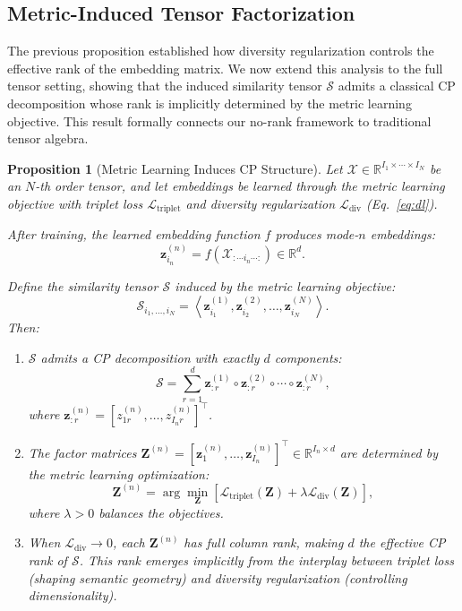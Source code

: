 \documentclass[a4paper,12pt,reqno]{amsart}
\newtheorem{proposition}[theorem]{\textbf{Proposition}}
\theoremstyle{definition}
\theoremstyle{remark}
\begin{document}
	\subsection{Metric-Induced Tensor Factorization}The previous proposition established how diversity regularization controls the effective rank of the embedding matrix. 
		We now extend this analysis to the full tensor setting, showing that the induced similarity tensor $\mathcal{S}$ 
		admits a classical CP decomposition whose rank is implicitly determined by the metric learning objective. 
		This result formally connects our no-rank framework to traditional tensor algebra.
		\begin{proposition}[Metric Learning Induces CP Structure]
		\label{prop:metric_factorization}
		Let $\mathcal{X} \in \mathbb{R}^{I_1 \times \cdots \times I_N}$ be an $N$-th order tensor, and let embeddings be learned through the metric learning objective with triplet loss $\mathcal{L}_{\text{triplet}}$ and diversity regularization $\mathcal{L}_{\text{div}}$ (Eq.~\eqref{eq:dl}). 
		
		After training, the learned embedding function $f$ produces mode-$n$ embeddings:
		\[
		\mathbf{z}_{i_n}^{(n)} = f(\mathcal{X}_{: \cdots i_n \cdots :}) \in \mathbb{R}^d.
		\]
		
		Define the similarity tensor $\mathcal{S}$ induced by the metric learning objective:
		\[
		\mathcal{S}_{i_1,\dots,i_N} = \left\langle \mathbf{z}_{i_1}^{(1)}, \mathbf{z}_{i_2}^{(2)}, \dots, \mathbf{z}_{i_N}^{(N)} \right\rangle.
		\]
		Then:
		\begin{enumerate}[label=(\alph*)]
			\item $\mathcal{S}$ admits a CP decomposition with exactly $d$ components:
			\[
			\mathcal{S} = \sum_{r=1}^d \mathbf{z}_{: r}^{(1)} \circ \mathbf{z}_{: r}^{(2)} \circ \cdots \circ \mathbf{z}_{: r}^{(N)},
			\]
			where $\mathbf{z}_{: r}^{(n)} = [z^{(n)}_{1 r}, \dots, z^{(n)}_{I_n r}]^\top$.
			
			\item The factor matrices $\mathbf{Z}^{(n)} = [\mathbf{z}_{1}^{(n)}, \dots, \mathbf{z}_{I_n}^{(n)}]^\top \in \mathbb{R}^{I_n \times d}$ are determined by the metric learning optimization:
			\[
			\mathbf{Z}^{(n)} = \arg\min_{\mathbf{Z}} \left[ \mathcal{L}_{\text{triplet}}(\mathbf{Z}) + \lambda \mathcal{L}_{\text{div}}(\mathbf{Z}) \right],
			\]
			where $\lambda > 0$ balances the objectives.
			
			\item When $\mathcal{L}_{\text{div}} \to 0$, each $\mathbf{Z}^{(n)}$ has full column rank, making $d$ the effective CP rank of $\mathcal{S}$. This rank emerges implicitly from the interplay between triplet loss (shaping semantic geometry) and diversity regularization (controlling dimensionality).
		\end{enumerate}
	\end{proposition}
\end{document}
